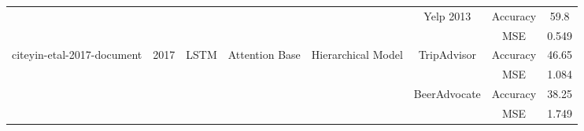 \documentclass[12pt, a4paper, oneside]{report}
\begin{document}
\begin{tabular}{|c|c|c|c|c|c|cc|}
                                                                          &                       &                                   &                                         &                                                                                                        & \multirow{2}{*}{Yelp 2013}            & \multicolumn{1}{c|}{Accuracy}                                                                                                      & 59.8   \\ \cline{7-8} 
                                                                          &                       &                                   &                                         &                                                                                                        &                                       & \multicolumn{1}{c|}{MSE}                                                                                                           & 0.549  \\ \hline
    \multirow{4}{*}{cite{yin-etal-2017-document}}       & \multirow{4}{*}{2017} & \multirow{4}{*}{LSTM}             & \multirow{4}{*}{Attention Base}         & \multirow{4}{*}{Hierarchical Model}                                                                    & \multirow{2}{*}{TripAdvisor}          & \multicolumn{1}{c|}{Accuracy}                                                                                                      & 46.65  \\ \cline{7-8} 
                                                                          &                       &                                   &                                         &                                                                                                        &                                       & \multicolumn{1}{c|}{MSE}                                                                                                           & 1.084  \\ \cline{6-8} 
                                                                          &                       &                                   &                                         &                                                                                                        & \multirow{2}{*}{BeerAdvocate}         & \multicolumn{1}{c|}{Accuracy}                                                                                                      & 38.25  \\ \cline{7-8} 
                                                                          &                       &                                   &                                         &                                                                                                        &                                       & \multicolumn{1}{c|}{MSE}                                                                                                           & 1.749  \\ \hline

\end{tabular}
\end{document}
